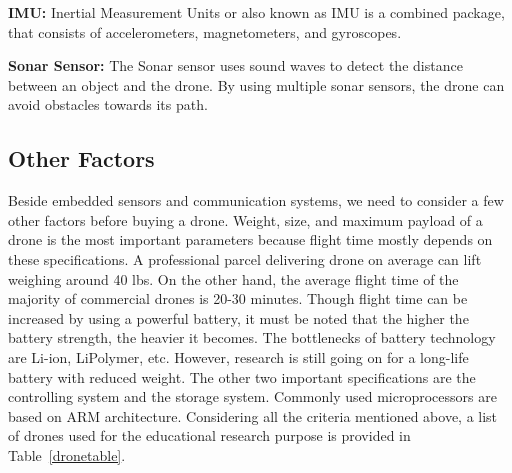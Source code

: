 \textbf{IMU:}
Inertial Measurement Units or also known as IMU is a combined package, that consists of accelerometers, magnetometers, and gyroscopes.

\textbf{Sonar Sensor:}
The Sonar sensor uses sound waves to detect the distance between an object and the drone. By using multiple sonar sensors, the drone can avoid obstacles towards its path.

\subsection{Other Factors}
Beside embedded sensors and communication systems, we need to consider a few other factors before buying a drone. Weight, size, and maximum payload of a drone is the most important parameters because flight time mostly depends on these specifications. A professional parcel delivering drone on average can lift weighing around 40 lbs. On the other hand, the average flight time of the majority of commercial drones is 20-30 minutes. Though flight time can be increased by using a powerful battery, it must be noted that the higher the battery strength, the heavier it becomes. The bottlenecks of battery technology are Li-ion, LiPolymer, etc. However, research is still going on for a long-life battery with reduced weight. The other two important specifications are the controlling system and the storage system. Commonly used microprocessors are based on ARM architecture. Considering all the criteria mentioned above, a list of drones used for the educational research purpose is provided in Table~\ref{dronetable}.


